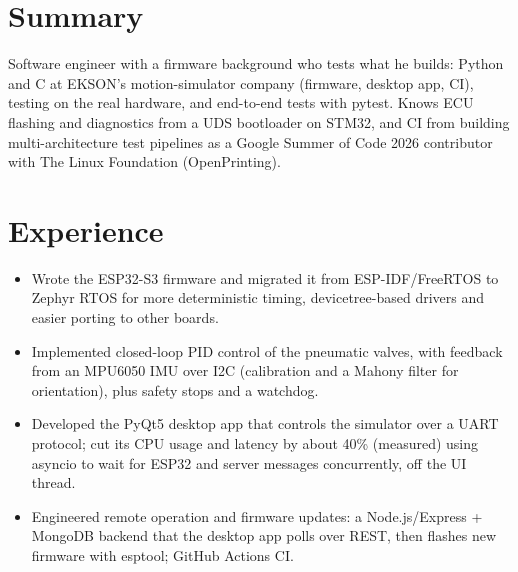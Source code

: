 \documentclass[10pt]{article}
\begin{document}

\section*{Summary}
Software engineer with a firmware background who tests what he builds: Python and C at EKSON's motion-simulator company (firmware, desktop app, CI), testing on the real hardware, and end-to-end tests with pytest. Knows ECU flashing and diagnostics from a UDS bootloader on STM32, and CI from building multi-architecture test pipelines as a Google Summer of Code 2026 contributor with The Linux Foundation (OpenPrinting).

\section*{Experience}
\begin{itemize}
  \item Wrote the ESP32-S3 firmware and migrated it from ESP-IDF/FreeRTOS to Zephyr RTOS for more deterministic timing, devicetree-based drivers and easier porting to other boards.
  \item Implemented closed-loop PID control of the pneumatic valves, with feedback from an MPU6050 IMU over I2C (calibration and a Mahony filter for orientation), plus safety stops and a watchdog.
  \item Developed the PyQt5 desktop app that controls the simulator over a UART protocol; cut its CPU usage and latency by about 40\% (measured) using asyncio to wait for ESP32 and server messages concurrently, off the UI thread.
  \item Engineered remote operation and firmware updates: a Node.js/Express + MongoDB backend that the desktop app polls over REST, then flashes new firmware with esptool; GitHub Actions CI.
\end{itemize}
\end{document}
